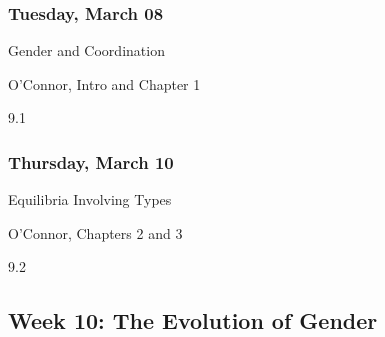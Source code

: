 \documentclass[
]{article}
\providecommand{\tightlist}{%
  \setlength{\itemsep}{0pt}\setlength{\parskip}{0pt}}
\begin{document}
\begin{multicols}{2}

\hypertarget{tuesday-march-08}{%
\subsubsection{Tuesday, March 08}\label{tuesday-march-08}}

\begin{description}
\tightlist
\item[Topic]
Gender and Coordination
\item[Reading]
O'Connor, Intro and Chapter 1
\item[Video lectures]
9.1
\end{description}

\hypertarget{thursday-march-10}{%
\subsubsection{Thursday, March 10}\label{thursday-march-10}}

\begin{description}
\tightlist
\item[Topic]
Equilibria Involving Types
\item[Reading]
O'Connor, Chapters 2 and 3
\item[Video lectures]
9.2
\end{description}

\end{multicols}

\hypertarget{week-10-the-evolution-of-gender}{%
\subsection{Week 10: The Evolution of
Gender}\label{week-10-the-evolution-of-gender}}
\end{document}
